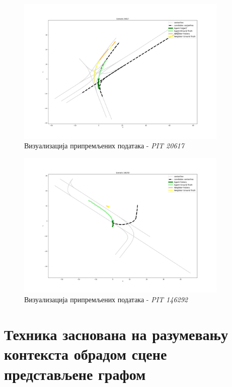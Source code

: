 \documentclass[11pt,oneside]{memoir}
\begin{document}
\begin{figure}[H]
  \includegraphics[width=0.9\textwidth]{images/scenario_PIT_20617.png}
  \caption{Визуализација припремљених података - \textit{PIT 20617}}
  \label{scenario-example-PIT-20617}
\end{figure}

\begin{figure}[H]
  \includegraphics[width=0.9\textwidth]{images/scenario_PIT_146292.png}
  \caption{Визуализација припремљених података - \textit{PIT 146292}}
  \label{scenario-example-PIT-146292}
\end{figure}

\chapter{Техника заснована на разумевању контекста обрадом сцене представљене графом}
\label{chp:razrada}
\end{document}
